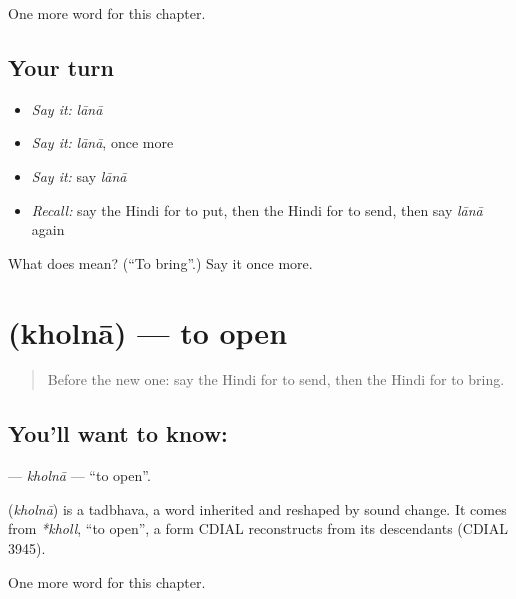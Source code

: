 \begin{grammarlens}[title={What you've built}]
One more word for this chapter.
\end{grammarlens}

\subsection*{Your turn}
\begin{itemize}
\raggedright
  \item \emph{Say it:} \emph{lānā}
  \item \emph{Say it:} \emph{lānā}, once more
  \item \emph{Say it:} say \emph{lānā}
  \item \emph{Recall:} say the Hindi for to put, then the Hindi for to send, then say \emph{lānā} again
\end{itemize}

\begin{tcolorbox}[breakable,colback=teal!4,colframe=teal!35!black,title={Before you move on}]
What does  mean? (\textquotedblleft{}To bring\textquotedblright{}.) Say it once more.
\end{tcolorbox}
\section[\texorpdfstring{\hi{खोलना} (kholnā)}{खोलना (kholnā)}]{ (kholnā) — to open}

\label{lesson:HI-C160-kholna}



\begin{quote}
Before the new one: say the Hindi for to send, then the Hindi for to bring.
\end{quote}

\subsection*{You'll want to know: }
\textbf{} — \emph{kholnā} — \textquotedblleft{}to open\textquotedblright{}.

\begin{cousinweb}
\textbf{} (\emph{kholnā}) is a tadbhava, a word inherited and reshaped by sound change. It comes from \emph{*kholl}, \textquotedblleft{}to open\textquotedblright{}, a form CDIAL reconstructs from its descendants (CDIAL 3945).
\end{cousinweb}

\begin{grammarlens}[title={What you've built}]
One more word for this chapter.
\end{grammarlens}

